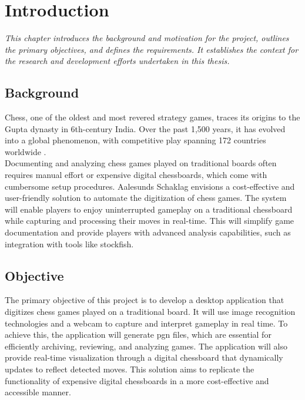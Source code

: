 \chapter{Introduction}

\begin{center} \textit{This chapter introduces the background and motivation for the project, outlines the primary objectives, and defines the requirements. It establishes the context for the research and development efforts undertaken in this thesis.}
\end{center}

\section{Background}

Chess, one of the oldest and most revered strategy games, traces its origins to the Gupta dynasty in 6th-century India. Over the past 1,500 years, it has evolved into a global phenomenon, with competitive play spanning 172 countries worldwide \cite{artsnculture}. \\

Documenting and analyzing chess games played on traditional boards often requires manual effort or expensive digital chessboards, which come with cumbersome setup procedures. Aalesunds Schaklag envisions a cost-effective and user-friendly solution to automate the digitization of chess games.  The system will enable players to enjoy uninterrupted gameplay on a traditional chessboard while capturing and processing their moves in real-time. This will simplify game documentation and provide players with advanced analysis capabilities, such as integration with tools like \gls{stockfish}.

\section{Objective}

The primary objective of this project is to develop a desktop application that digitizes chess games played on a traditional board. It will use image recognition technologies and a webcam to capture and interpret gameplay in real time. To achieve this, the application will generate \gls{pgn} files, which are essential for efficiently archiving, reviewing, and analyzing games. The application will also provide real-time visualization through a digital chessboard that dynamically updates to reflect detected moves. This solution aims to replicate the functionality of expensive digital chessboards in a more cost-effective and accessible manner.


